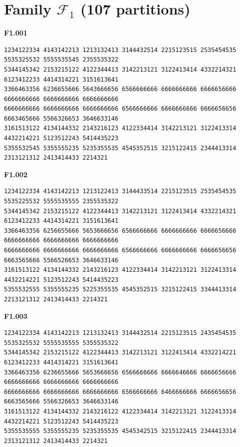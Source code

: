 \section*{\texorpdfstring{Family $\mathcal F_1$ (107 partitions)}{Family F1 (107)}}

\noindent\begin{minipage}{\linewidth}\textbf{F1.001}
\begin{lstlisting}
1234122334 4143142213 1213132413 3144432514 2215123515 2535454535 5535325532 5555535545 2355535322
5344145342 2153215122 4122344413 3142213121 3122413414 4332214321 6123412233 4414314221 3151613641
3366463356 6236655666 5643666656 6566666666 6666666666 6666656666 6666666666 6666666666 6666666666
6666666666 6666666666 6666666666 6566666666 6666666666 6666656656 6663465666 5566326653 3646633146
3161513122 4134144332 2143216123 4122334414 3142213121 3122413314 4432214221 5123512243 5414435223
5355532545 5355555235 5235355535 4545352515 3215122415 2344413314 2313121312 2413414433 2214321
\end{lstlisting}
\end{minipage}\par\smallskip

\noindent\begin{minipage}{\linewidth}\textbf{F1.002}
\begin{lstlisting}
1234122334 4143142213 1213122413 3144433514 2215123515 2535454535 5535225532 5555535555 2355535322
5344145342 2153215122 4122344413 3142213121 3122413414 4332214321 6123412233 4414314221 3151613641
3366463356 6256655666 5653666656 6566666666 6666666666 6666656666 6666666666 6666666666 6666666666
6666666666 6666666666 6666666666 6566666666 6666666666 6666656656 6663565666 5566526653 3646633146
3161513122 4134144332 2143216123 4122334414 3142213121 3122413314 4432214221 5123512243 5414435223
5355532555 5355555235 5225355535 4545352515 3215122415 3344413314 2213121312 2413414433 2214321
\end{lstlisting}
\end{minipage}\par\smallskip

\noindent\begin{minipage}{\linewidth}\textbf{F1.003}
\begin{lstlisting}
1234122334 4143142213 1213132413 3144432514 2215123515 2435454535 5535325532 5555535555 5355535322
5344145342 2153215122 4122344413 3142213121 3122413414 4332214221 6123412233 4414314221 3151613641
3366463356 6236655666 5653666656 6566666666 6666646666 6666656666 6666666666 6666666666 6666666666
6666666666 6666666666 6666666666 6566666666 6466666666 6666656656 6663565666 5566326653 3646633146
3161513122 4134144332 2143216122 4122334414 3142213121 3122413314 4432214221 5123512243 5414435223
5355535555 5355555235 5235355535 4545342515 3215122415 2344413314 2313121312 2413414433 2214321
\end{lstlisting}
\end{minipage}\par\smallskip

